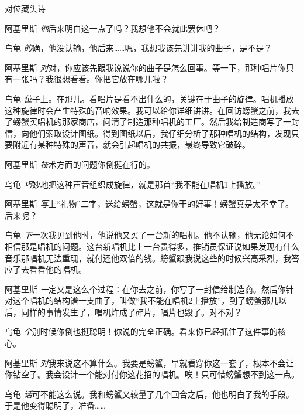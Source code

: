 \begin{dialog}{对位藏头诗}
\begin{dialogue}
\item[阿基里斯]\emph{他}后来明白这一点了吗？我想他不会就此罢休吧？

\item[乌龟]\emph{的}确，他没认输，他后来……嗯，我想我该先讲讲我的曲子，是不是？

\item[阿基里斯]\emph{对}对，你应该先跟我说说你的曲子是怎么回事。等一下，那种唱片你只有一张吗？我很想看看。你把它放在哪儿啦？

\item[乌龟]\emph{位}子上。在那儿。看唱片是看不出什么的，关键在于曲子的旋律。唱机播放这种旋律时会产生特殊的音响效果。我可以给你详细讲讲。在回访螃蟹之前，我去了螃蟹买唱机的那家商店，问清了制造那种唱机的工厂。然后我给制造商写了一封信，向他们索取设计图纸。得到图纸以后，我仔细分析了那种唱机的结构，发现只要附近有某种特殊的声音，就会引起唱机的共振，最终导致它破碎。

\item[阿基里斯]\emph{技}术方面的问题你倒挺在行的。

\item[乌龟]\emph{巧}妙地把这种声音组织成旋律，就是那首“我不能在唱机1上播放。”

\item[阿基里斯]\emph{写}上“礼物”二字，送给螃蟹，这就是你干的好事！螃蟹真是太不幸了。后来呢？

\item[乌龟]\emph{下}一次我见到他时，他说他又买了一台新的唱机。他不认输，他无论如何不相信那是唱机的问题。这台新唱机比上一台贵得多，推销员保证说如果发现有什么音乐那唱机无法重现，就付还他双倍的钱。螃蟹跟我说这些的时候兴高采烈，我答应了去看看他的唱机。

\item[阿基里斯]\emph{一}定又是这么个过程：在你去之前，你写了一封信给制造商。然后你针对这个唱机的结构谱一支曲子，叫做“我不能在唱机2上播放”，到了螃蟹那儿以后，同样的事情发生了，唱机炸成了碎片，唱片也毁了。对不对？

\item[乌龟]\emph{个}别时候你倒也挺聪明！你说的完全正确。看来你已经抓住了这件事的核心。

\item[阿基里斯]\emph{对}我来说这不算什么。我要是螃蟹，早就看穿你这一套了，根本不会让你钻空子。我会设计一个能对付你这花招的唱机。唉！只可惜螃蟹想不到这一点。

\item[乌龟]\emph{话}可不能这么说。我和螃蟹又较量了几个回合之后，他也明白了我的手段。于是他变得聪明了，准备……


\end{dialogue}
\end{dialog}
